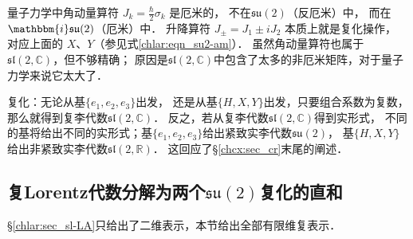 \begin{remark}
量子力学中角动量算符 $J_k = \frac{\hbar}{2}\sigma_k$ 是厄米的，
不在$\mathfrak{su}(2)$（反厄米）中，
而在$\mathbbm{i}\mathfrak{su}(2)$（厄米）中．
升降算符 $J_\pm = J_1 \pm iJ_2$ 本质上就是复化操作，
对应上面的 $X$、$Y$（参见式\eqref{chlar:eqn_su2-am}）． 
虽然角动量算符也属于$\mathfrak{sl}(2, \mathbb{C})$，但不够精确；
原因是$\mathfrak{sl}(2, \mathbb{C})$中包含了太多的非厄米矩阵，对于量子力学来说它太大了．
\end{remark}

\begin{remark}\label{chlar:rek_rc}
	复化：无论从基$\{e_1,e_2,e_3\}$出发，
	还是从基$\{H,X,Y\}$出发，只要组合系数为复数，
	那么就得到复李代数$\mathfrak{sl}(2, \mathbb{C})$．
	反之，若从复李代数$\mathfrak{sl}(2, \mathbb{C})$得到实形式，
	不同的基将给出不同的实形式；基$\{e_1,e_2,e_3\}$给出紧致实李代数$\mathfrak{su}(2)$，
	基$\{H,X,Y\}$给出非紧致实李代数$\mathfrak{sl}(2, \mathbb{R})$．
	这回应了\S\ref{chcx:sec_cr}末尾的阐述．
\end{remark}



\subsection{复Lorentz代数分解为两个$\mathfrak{su}(2)$复化的直和}\label{chlar:sec_sl-LA2}

\S\ref{chlar:sec_sl-LA}只给出了二维表示，本节给出全部有限维复表示．

